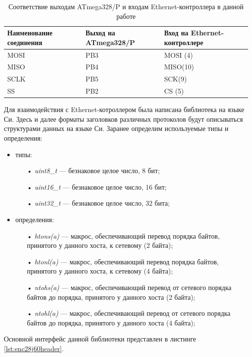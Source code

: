 \begin{table}[h!]
\caption{Соответствие выходам ATmega328/P и входам Ethernet-контроллера в данной работе}
\label{connection}
	\begin{tabular}{|p{40mm}|p{40mm}|p{40mm}|}
\hline
	Наименование соединения & Выход на ATmega328/P & Вход на Ethernet-контроллере \\
\hline
		MOSI & PB3 & MOSI (4)\\
\hline
		MISO & PB4 & MISO(10)\\
\hline
		SCLK & PB5 & SCK(9)\\
\hline
		SS & PB2 & CS (5)\\
\hline
\end{tabular}
\end{table}

Для взаимодействия с Ethernet-котроллером была написана библиотека на языке Си. Здесь и далее форматы заголовков различных протоколов будут описываться структурами данных на языке Си. Заранее определим используемые типы и определения:
\begin{itemize}
	\item типы:
	\begin{itemize}
		\item[•] \textit{uint8\_t} --- безнаковое целое число, 8 бит;
		\item[•] \textit{uint16\_t} --- безнаковое целое число, 16 бит;
		\item[•] \textit{uint32\_t} --- безнаковое целое число, 32 бита;
	\end{itemize}
	\item определения:
	\begin{itemize}
		\item[•] \textit{htons(a)} --- макрос, обеспечивающий перевод порядка байтов, принятого у данного хоста, к сетевому (2 байта);
		\item[•] \textit{htonl(a)} --- макрос, обеспечивающий перевод порядка байтов, принятого у данного хоста, к сетевому (4 байта);
		\item[•] \textit{ntohs(a)} --- макрос, обеспечивающий перевод от сетевого порядка байтов до порядка, принятого у данного хоста (2 байта);
		\item[•] \textit{ntohl(a)} --- макрос, обеспечивающий перевод от сетевого порядка байтов до порядка, принятого у данного хоста (4 байта);
	\end{itemize}
\end{itemize}

Основной интерфейс данной библиотеки представлен в листинге \ref{lst:enc28j60header}. 

